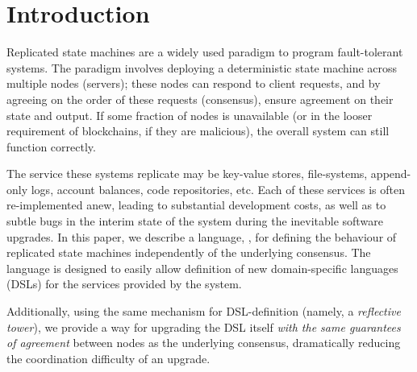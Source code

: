 \section{Introduction}
\label{s:introduction}







Replicated state machines are a widely used paradigm to program fault-tolerant
systems. The paradigm involves deploying a deterministic state machine across
multiple nodes (servers); these nodes can respond to client requests, and by
agreeing on the order of these requests (consensus), ensure agreement on their
state and output. If some fraction of nodes is unavailable (or in the looser
requirement of blockchains, if they are malicious), the overall system can
still function correctly.

The service these systems replicate may be key-value stores, file-systems,
append-only logs, account balances, code repositories, etc. Each of these
services is often re-implemented anew, leading to substantial development
costs, as well as to subtle bugs in the interim state of the system during the
inevitable software upgrades. In this paper, we describe a language, \rad, for
defining the behaviour of replicated state machines independently of the
underlying consensus. The language is designed to easily allow definition of
new domain-specific languages (DSLs) for the services provided by the system.

Additionally, using the same mechanism for DSL-definition (namely, a
\textit{reflective tower}), we provide a way for upgrading the DSL itself
\textit{with the same guarantees of agreement} between nodes as the underlying
consensus, dramatically reducing the coordination difficulty of an upgrade.


